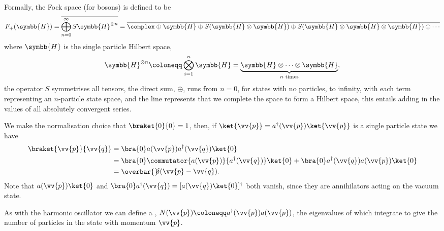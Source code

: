 \documentclass[fleqn]{NotesClass}
\newcommand{\hermit}{{\dagger}}
\newcommand\bardelta{\ThisStyle{\ensurestackMath{%
            \stackengine{-.3\LMpt}{\SavedStyle \delta}{\SavedStyle\overbar{}%
                \mkern4.5mu}{O}{r}{F}{F}{L}}}}
\newcommand{\hilbertSpace}{\symbb{H}}
\begin{document}
    Formally, the Fock space (for bosons) is defined to be
    \begin{equation}
        F_+(\hilbertSpace) = \overline{\bigoplus_{n = 0}^{\infty} S \hilbertSpace^{\otimes n}} = \overline{\complex \oplus \hilbertSpace \oplus S(\hilbertSpace \otimes \hilbertSpace) \oplus S(\hilbertSpace \otimes \hilbertSpace \otimes \hilbertSpace) \oplus \dotsb}
    \end{equation}
    where \(\hilbertSpace\) is the single particle Hilbert space,
    \begin{equation}
        \hilbertSpace^{\otimes n} \coloneqq \bigotimes_{i = 1}^{n}\hilbertSpace = \underbrace{\hilbertSpace \otimes \dotsb \otimes \hilbertSpace}_{n \text{ times}},
    \end{equation}
    the operator \(S\) symmetrises all tensors, the direct sum, \(\oplus\), runs from \(n = 0\), for states with no particles, to infinity, with each term representing an \(n\)-particle state space, and the line represents that we complete the space to form a Hilbert space, this entails adding in the values of all absolutely convergent series.
    
    We make the normalisation choice that \(\braket{0}{0} = 1\), then, if \(\ket{\vv{p}} = a^\hermit(\vv{p})\ket{\vv{p}}\) is a single particle state we have
    \begin{align}
        \braket{\vv{p}}{\vv{q}} &= \bra{0} a(\vv{p}) a^\hermit(\vv{q})\ket{0}\\
        &= \bra{0} \commutator{a(\vv{p})}{a^\hermit(\vv{q})}\ket{0} + \bra{0} a^\hermit(\vv{q}) a(\vv{p})\ket{0}\\
        &= \bardelta(\vv{p} - \vv{q}).
    \end{align}
    Note that \(a(\vv{p})\ket{0}\) and \(\bra{0}a^\hermit(\vv{q}) = [a(\vv{q}) \ket{0}]^\hermit\) both vanish, since they are annihilators acting on the vacuum state.
    
    As with the harmonic oscillator we can define a , \(N(\vv{p}) \coloneqq a^\hermit(\vv{p})a(\vv{p})\), the eigenvalues of which integrate to give the number of particles in the state with momentum \(\vv{p}\).
    
\end{document}
